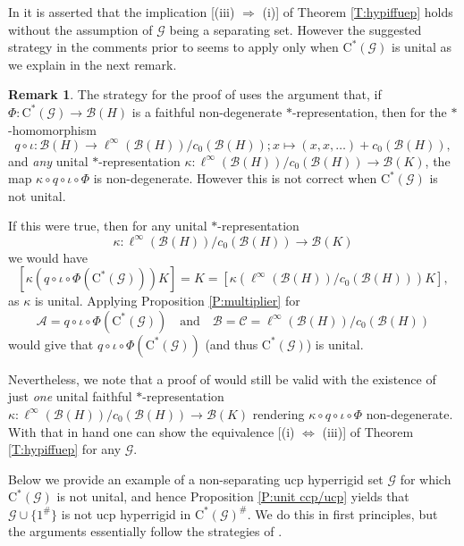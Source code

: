 \documentclass[11pt, draft]{amsart}
\numberwithin{equation}{section}
\theoremstyle{plain}
\theoremstyle{definition}
\newtheorem{remark}[theorem]{Remark}
\theoremstyle{remark}
\newcommand{\A}{{\mathcal{A}}}
\newcommand{\B}{{\mathcal{B}}}
\newcommand{\C}{{\mathcal{C}}}
\newcommand{\G}{{\mathcal{G}}}
\def\io{\iota}
\def\ka{\kappa}
\newcommand{\qand}{\quad\text{and}\quad}
\newcommand{\ca}{\mathrm{C}^*}
\begin{document}
In \cite[Lemma 2.7 item (ii)]{Sal17} it is asserted that the implication [(iii) $\Rightarrow$ (i)] of Theorem \ref{T:hypiffuep} holds without the assumption of $\G$ being a separating set.
However the suggested strategy in the comments prior to \cite[Lemma 2.7]{Sal17} seems to apply only when $\ca(\G)$ is unital as we explain in the next remark.

\begin{remark} \label{R:Salunit}
The strategy for the proof of \cite[Lemma 2.7 item (ii)]{Sal17} uses the argument that, if $\Phi \colon \ca(\G) \to \B(H)$ is a faithful non-degenerate $*$-representation, then for the $*$-homomorphism 
\[
q\circ\iota \colon \B(H) \to \ell^\infty(\B(H))/c_0(\B(H)) ; x \mapsto (x, x, \dots) + c_0(\B(H)),
\]
and \emph{any} unital $*$-representation $\ka \colon \ell^\infty(\B(H))/c_0(\B(H)) \to \B(K)$, the map $\ka \circ q\circ \io \circ \Phi$ is non-degenerate.
However this is not correct when $\ca(\G)$ is not unital.

If this were true, then for any unital $*$-representation 
\[
\ka \colon \ell^\infty(\B(H))/c_0(\B(H)) \to \B(K)
\]
we would have
\[
[\ka(q\circ \io \circ \Phi(\ca(\G))) K] = K = [\ka(\ell^\infty(\B(H))/c_0(\B(H))) K],
\]
as $\ka$ is unital.
Applying Proposition \ref{P:multiplier} for 
\[
\A = q\circ \io \circ \Phi(\ca(\G))
\qand 
\B=\C=\ell^\infty(\B(H))/c_0(\B(H))
\]
would give that $q\circ \io \circ \Phi(\ca(\G))$ (and thus $\ca(\G)$) is unital.

Nevertheless, we note that a proof of \cite[Lemma 2.7 item (ii)]{Sal17} would still be valid with the existence of just \emph{one} unital faithful $*$-representation $\ka \colon \ell^\infty(\B(H))/c_0(\B(H)) \to \B(K)$ rendering $\ka \circ q\circ \io \circ \Phi$ non-degenerate.
With that in hand one can show the equivalence [(i) $\Leftrightarrow$ (iii)] of Theorem \ref{T:hypiffuep} for any $\G$.
\end{remark}

Below we provide an example of a non-separating ucp hyperrigid set $\G$ for which $\ca(\G)$ is not unital, and hence Proposition \ref{P:unit ccp/ucp} yields that $\G \cup \{1^{\#}\}$ is not ucp hyperrigid in $\ca(\G)^\#$.
We do this in first principles, but the arguments essentially follow the strategies of \cite{Sal17}.
\end{document}
